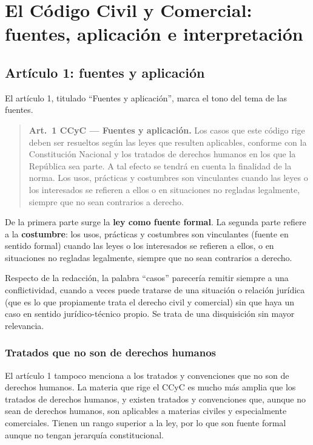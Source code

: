 \documentclass[12pt,oneside]{book}
\begin{document}
\chapter[Arts. 1 y 2 del Código Civil y Comercial]{El Código Civil y Comercial: fuentes, aplicación e interpretación}

\section{Artículo 1: fuentes y aplicación}

El artículo 1, titulado ``Fuentes y aplicación'', marca el tono del tema de las fuentes.

\begin{quote}
\textbf{Art.~1 CCyC --- Fuentes y aplicación.} Los casos que este código rige deben ser resueltos según las leyes que resulten aplicables, conforme con la Constitución Nacional y los tratados de derechos humanos en los que la República sea parte. A tal efecto se tendrá en cuenta la finalidad de la norma. Los usos, prácticas y costumbres son vinculantes cuando las leyes o los interesados se refieren a ellos o en situaciones no regladas legalmente, siempre que no sean contrarios a derecho.
\end{quote}

De la primera parte surge la \textbf{ley como fuente formal}. La segunda parte refiere a la \textbf{costumbre}: los usos, prácticas y costumbres son vinculantes (fuente en sentido formal) cuando las leyes o los interesados se refieren a ellos, o en situaciones no regladas legalmente, siempre que no sean contrarios a derecho.

Respecto de la redacción, la palabra ``casos'' parecería remitir siempre a una conflictividad, cuando a veces puede tratarse de una situación o relación jurídica (que es lo que propiamente trata el derecho civil y comercial) sin que haya un caso en sentido jurídico-técnico propio. Se trata de una disquisición sin mayor relevancia.

\subsection{Tratados que no son de derechos humanos}

El artículo 1 tampoco menciona a los tratados y convenciones que no son de derechos humanos. La materia que rige el CCyC es mucho más amplia que los tratados de derechos humanos, y existen tratados y convenciones que, aunque no sean de derechos humanos, son aplicables a materias civiles y especialmente comerciales. Tienen un rango superior a la ley, por lo que son fuente formal aunque no tengan jerarquía constitucional.
\end{document}
